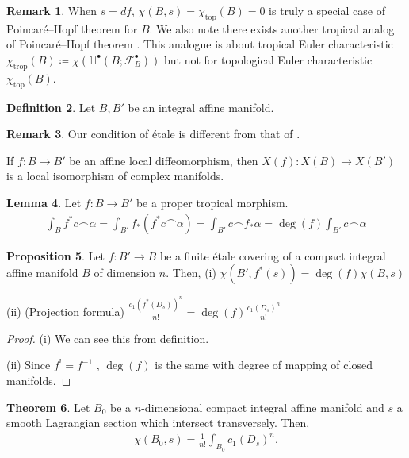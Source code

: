 \documentclass[a4paper,dvipdfmx,reqno,12pt]{amsart}
\theoremstyle{definition}
\newtheorem{Thm}{Theorem}[section]
\newtheorem{Def}[Thm]{Definition}
\newtheorem{Prop}[Thm]{Proposition}
\newtheorem{Lem}[Thm]{Lemma}
\newtheorem{Rmk}[Thm]{Remark}
\newcommand{\deq}{\coloneqq}
\newcommand{\mb}[1]{\mathbb{#1}}%
\newcommand{\mcal}[1]{\mathcal{#1}}%
\newcommand{\opn}[1]{\operatorname{#1}}
\numberwithin{equation}{section}
\begin{document}
\begin{Rmk}
When $s=df$, $\chi(B,s)=\chi_{\opn{top}}(B)=0$ is 
truly a special case of Poincar\'e--Hopf theorem for $B$.
We also note there exists another tropical analog of Poincar\'e--Hopf theorem
  \cite{rau2020tropical}. This analogue is about tropical Euler characteristic
$\chi_{\opn{trop}}(B)\deq \chi(\mb{H}^{\bullet}(B;\mcal{F}_B^{\bullet}))$
  but not for topological Euler characteristic $\chi_{\opn{top}}(B)$.
\end{Rmk}

\begin{Def}
Let $B,B'$ be an integral affine manifold.
\end{Def}

\begin{Rmk}
Our condition of \'etale is different from that of 
\cite[Definition 1.1]{grossMirrorSymmetryLogarithmic2006a}.

If $f\colon B\to B'$ be an affine local diffeomorphism,
then $X(f)\colon X(B) \to X(B')$ is a local isomorphism of
complex manifolds.
\end{Rmk}

\begin{Lem}
  Let $f:B\to B'$ be a proper tropical morphism.
  \begin{align}
    \int_{B} f^{*}c\frown \alpha=\int_{B'} f_*(f^{*}c\frown \alpha)
    =\int_{B'}c \frown f_*\alpha=\opn{deg}(f)\int_{B'} c\frown \alpha
  \end{align}
\end{Lem}

\begin{Prop} \label{thm: intetale}
Let $f\colon B'\to B$ be a finite \'etale covering of a compact integral affine 
manifold $B$ of dimension $n$. Then,
(i) $\chi(B',f^{*}(s))=\opn{deg}(f)\chi(B,s)$

(ii) (Projection formula) 
$\frac{c_1(f^{*}(D_s))^{n}}{n!}=
\opn{deg}(f)\frac{c_1(D_s)^{n}}{n!}$
\end{Prop}
\begin{proof}
(i) We can see this from definition.

(ii) Since $f^{!}=f^{-1}$ 
\cite[]{iversenCohomologySheaves1986a}
, $\opn{deg}(f)$ is the same with degree of 
mapping of closed manifolds.

\end{proof}

\begin{Thm} \label{thm: HesseRR}
  Let $B_0$ be a $n$-dimensional compact integral affine manifold and
  $s$ a smooth Lagrangian section
  which intersect transversely. Then,
  \begin{align} \label{eq: HesseRR}
    \chi(B_0,s)=\frac{1}{n!}\int_{B_0}c_1(D_s)^{n}.
  \end{align}
\end{Thm}
\end{document}
